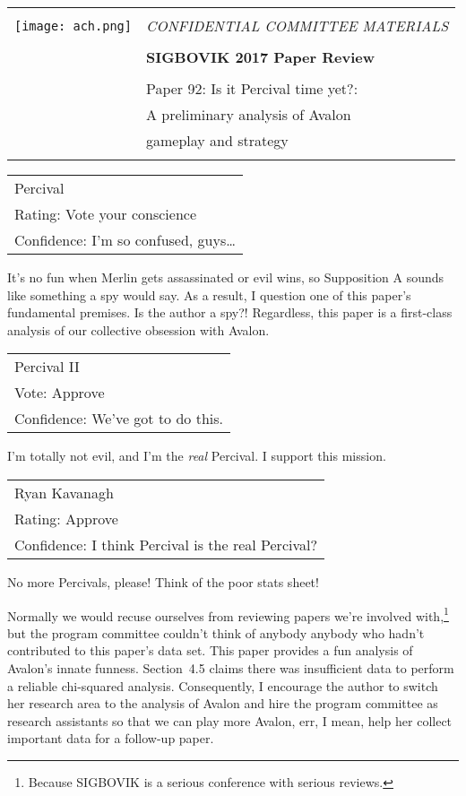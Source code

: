 \documentclass[12pt]{article}
\begin{document}
{\sffamily
\begin{tabular}{ll}
\multirow{3}{*}{\texttt{[image: ach.png]}}\\
& \Large{\em CONFIDENTIAL COMMITTEE MATERIALS} \\
&\\
& \textbf{\Huge{SIGBOVIK 2017 Paper Review}} \\
&\\
& \LARGE{Paper 92: Is it Percival time yet?:}\\
& \LARGE{A preliminary analysis of Avalon} \\
& \LARGE{gameplay and strategy}\\
&\\
\hline
\end{tabular}}
\vspace{2em}
\thispagestyle{empty}

{\large\bf
\begin{tabular}{l}
  Percival\\
  Rating: Vote your conscience\\
  Confidence: I'm so confused, guys\ldots
\end{tabular}}
\vspace{0.5em}

It's no fun when Merlin gets assassinated or evil wins, so Supposition
A sounds like something a spy would say. As a result, I question one
of this paper's fundamental premises. Is the author a spy?!
Regardless, this paper is a first-class analysis of our collective
obsession with Avalon.

{\large\bf
  \begin{tabular}{l}
    Percival II\\
    Vote: Approve\\
    Confidence: We've got to do this.
  \end{tabular}}
\vspace{0.5em}

I'm totally not evil, and I'm the \textit{real} Percival. I support
this mission.

{\large\bf
  \begin{tabular}{l}
    Ryan Kavanagh\\
    Rating: Approve\\
    Confidence: I think Percival is the real Percival?
  \end{tabular}}
\vspace{0.5em}

No more Percivals, please! Think of the poor stats sheet!

Normally we would recuse ourselves from reviewing papers we're
involved with,\footnote{Because SIGBOVIK is a serious conference with
  serious reviews.} but the program committee couldn't think of
anybody anybody who hadn't contributed to this paper's data set. This
paper provides a fun analysis of Avalon's innate funness. Section~4.5
claims there was insufficient data to perform a reliable chi-squared
analysis. Consequently, I encourage the author to switch her research
area to the analysis of Avalon and hire the program committee as
research assistants so that we can play more Avalon, err, I mean, help
her collect important data for a follow-up paper.
\end{document}
